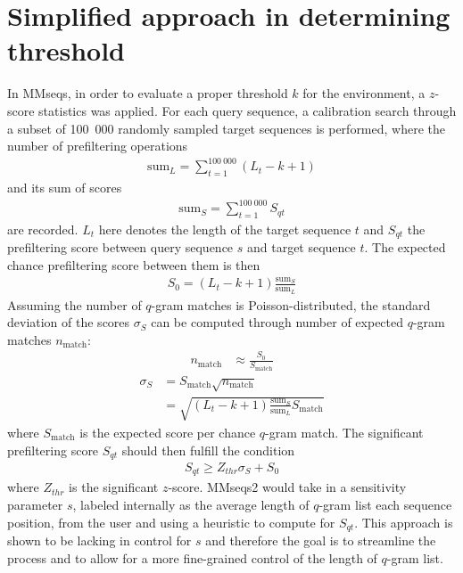\documentclass[twoside,a4paper,bsc]{master}
\newcommand{\Qgram}[1]{\(#1\)-gram}
\begin{document}
\section{Simplified approach in determining threshold}
In MMseqs, in order to evaluate a proper threshold \(k\) for the
environment, a \(z\)-score statistics was applied. For each query sequence,
a calibration search through a subset of 100~000 randomly sampled target
sequences is performed, where the number of prefiltering operations
\begin{align}
\text{sum}_L = \sum_{t=1}^{100~000} (L_t-k+1)
\end{align}
and its sum of scores
\begin{align}
\text{sum}_S = \sum_{t=1}^{100~000} S_{qt}
\end{align}
are recorded. \(L_t\) here denotes the length of the target sequence \(t\)
and \(S_{qt}\) the prefiltering score between query sequence \(s\) and
target sequence \(t\). The expected chance prefiltering score between them
is then
\begin{align}
S_0 = (L_t-k+1)\frac{\text{sum}_S}{\text{sum}_L}
\end{align}
Assuming the number of \Qgram{q} matches is Poisson-distributed, the
standard deviation of the scores \(\sigma_S\) can be computed through
number of expected \Qgram{q} matches \(n_{\text{match}}\):
\begin{align}
n_{\text{match}} &\approx \frac{S_0}{S_{\text{match}}}
\end{align}
\begin{align}
\sigma_S &= S_{\text{match}}\sqrt{n_{\text{match}}}\\
&= \sqrt{(L_t-k+1)\frac{\text{sum}_S}{\text{sum}_L}S_{\text{match}}}
\end{align}
where \(S_{\text{match}}\) is the expected score per chance \Qgram{q}
match. The significant prefiltering score \(S_{qt}\) should then fulfill
the condition
\begin{align}
S_{qt} \geq Z_{thr}\sigma_S + S_0
\end{align}
where \(Z_{thr}\) is the significant \(z\)-score. MMseqs2 would take in a
sensitivity parameter \(s\), labeled internally as the average length of
\Qgram{q} list each sequence position, from the user and using a heuristic
to compute for \(S_{qt}\). This approach is shown to be lacking in control
for \(s\) and therefore the goal is to streamline the process and to allow
for a more fine-grained control of the length of \Qgram{q} list.
\end{document}
